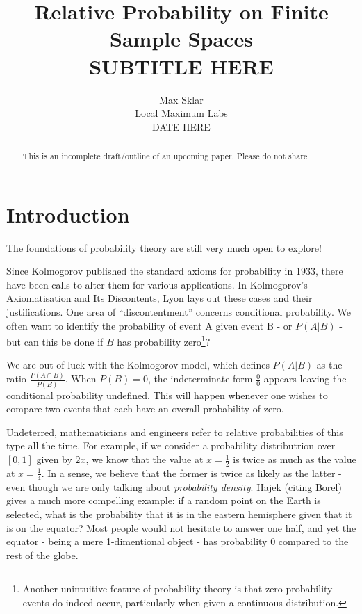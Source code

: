 \documentclass[twoside]{article}
\newcommand{\quotes}[1]{``#1''}
\theoremstyle{plain}%
\theoremstyle{definition}
\theoremstyle{remark}
\begin{document}
\parindent=0in
\parskip=12pt


\title{
  Relative Probability on Finite Sample Spaces \\
  \large{
    SUBTITLE HERE
  }
}

\author{Max Sklar\\ Local Maximum Labs \\ DATE HERE}
\date{}

\maketitle
\thispagestyle{empty}

\begin{abstract}
This is an incomplete draft/outline of an upcoming paper. Please do not share
\end{abstract}

\tableofcontents
\newpage

\section{Introduction}

The foundations of probability theory are still very much open to explore!

Since Kolmogorov published the standard axioms for probability\cite{kolmogorov} in 1933, there have been calls to alter them for various applications. In Kolmogorov's Axiomatisation and Its Discontents\cite{lyon}, Lyon lays out these cases and their justifications.
One area of \quotes{discontentment} concerns conditional probability. We often want to identify the probability of event A given event B - or \(P(A|B)\) - but can this be done if \(B\) has probability zero\footnote{Another unintuitive feature of probability theory is that zero probability events do indeed occur, particularly when given a continuous distribution.}?

We are out of luck with the Kolmogorov model, which defines \(P(A|B)\) as the ratio \(\frac{P(A \cap B)}{P(B)}\). When \(P(B) = 0\), the indeterminate form \(\frac{0}{0}\) appears leaving the conditional probability undefined. This will happen whenever one wishes to compare two events that each have an overall probability of zero.

Undeterred, mathematicians and engineers refer to relative probabilities of this type all the time. For example, if we consider a probability distributrion over \([0, 1]\) given by \(2x\), we know that the value at \(x = \frac{1}{2}\) is twice as much as the value at \(x = \frac{1}{4}\). In a sense, we believe that the former is twice as likely as the latter - even though we are only talking about \textit{probability density}. Hajek\cite{hajek} (citing Borel) gives a much more compelling example: if a random point on the Earth is selected, what is the probability that it is in the eastern hemisphere given that it is on the equator? Most people would not hesitate to answer one half, and yet the equator - being a mere 1-dimentional object - has probability 0 compared to the rest of the globe.
\end{document}
